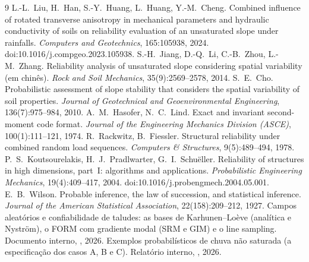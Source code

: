 \documentclass[11pt,a4paper]{article}
\begin{document}
\begin{thebibliography}{9}
 L.-L.~Liu, H.~Han, S.-Y.~Huang, L.~Huang, Y.-M.~Cheng. Combined influence of rotated transverse
  anisotropy in mechanical parameters and hydraulic conductivity of soils on reliability evaluation of an unsaturated
  slope under rainfalls. \emph{Computers and Geotechnics}, 165:105938, 2024. doi:10.1016/j.compgeo.2023.105938.
 S.-H.~Jiang, D.-Q.~Li, C.-B.~Zhou, L.-M.~Zhang. Reliability analysis of unsaturated slope
  considering spatial variability (em chinês). \emph{Rock and Soil Mechanics}, 35(9):2569--2578, 2014.
 S.~E.~Cho. Probabilistic assessment of slope stability that considers the spatial variability of
  soil properties. \emph{Journal of Geotechnical and Geoenvironmental Engineering}, 136(7):975--984, 2010.
 A.~M.~Hasofer, N.~C.~Lind. Exact and invariant second-moment code format. \emph{Journal of the
  Engineering Mechanics Division (ASCE)}, 100(1):111--121, 1974.
 R.~Rackwitz, B.~Fiessler. Structural reliability under combined random load sequences.
  \emph{Computers \& Structures}, 9(5):489--494, 1978.
 P.~S.~Koutsourelakis, H.~J.~Pradlwarter, G.~I.~Schuëller. Reliability of structures in
  high dimensions, part~I: algorithms and applications. \emph{Probabilistic Engineering Mechanics}, 19(4):409--417,
  2004. doi:10.1016/j.probengmech.2004.05.001.
 E.~B.~Wilson. Probable inference, the law of succession, and statistical inference.
  \emph{Journal of the American Statistical Association}, 22(158):209--212, 1927.
 Campos aleatórios e confiabilidade de taludes: as bases de Karhunen--Loève (analítica e Nyström),
  o FORM com gradiente modal (SRM e GIM) e o line sampling. Documento interno,
  , 2026.
 Exemplos probabilísticos de chuva não saturada (a especificação dos casos A, B e C). Relatório
  interno, , 2026.
\end{thebibliography}

\appendix
\end{document}
